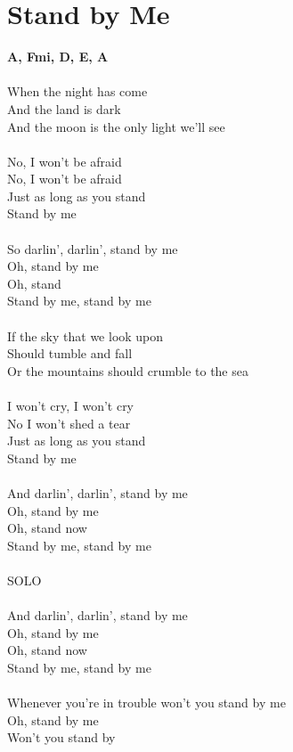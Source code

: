 \section{Stand by Me}
\footnotesize\textbf{A, F\kr mi, D, E, A}\\
\normalsize
\\
When the night has come\\
And the land is dark\\
And the moon is the only light we'll see\\
\\
No, I won't be afraid\\
No, I won't be afraid\\
Just as long as you stand\\
Stand by me\\
\\
So darlin', darlin', stand by me\\
Oh, stand by me\\
Oh, stand\\
Stand by me, stand by me\\
\\
If the sky that we look upon\\
Should tumble and fall\\
Or the mountains should crumble to the sea\\
\\
I won't cry, I won't cry\\
No I won't shed a tear\\
Just as long as you stand\\
Stand by me\\
\\
And darlin', darlin', stand by me\\
Oh, stand by me\\
Oh, stand now\\
Stand by me, stand by me\\
\\
SOLO\\
\\
And darlin', darlin', stand by me\\
Oh, stand by me\\
Oh, stand now\\
Stand by me, stand by me\\
\\
Whenever you're in trouble won't you stand by me\\
Oh, stand by me\\
Won't you stand by